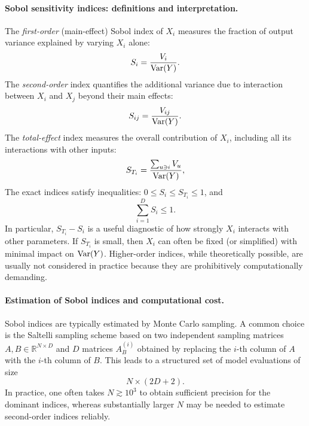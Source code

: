 \paragraph{Sobol sensitivity indices: definitions and interpretation.}
The \emph{first-order} (main-effect) Sobol index of $X_i$ measures the fraction
of output variance explained by varying $X_i$ alone:
\begin{equation}
S_i = \frac{V_i}{\mathop{\rm Var}(Y)}.
\end{equation}
The \emph{second-order} index quantifies the additional variance due to
interaction between $X_i$ and $X_j$ beyond their main effects:
\begin{equation}
S_{ij} = \frac{V_{ij}}{\mathop{\rm Var}(Y)}.
\end{equation}
The \emph{total-effect} index measures the overall contribution of $X_i$,
including all its interactions with other inputs:
\begin{equation}
S_{T_i} = \frac{\sum_{u\ni i} V_u}{\mathop{\rm Var}(Y)},
\end{equation}
The exact indices satisfy inequalities:
$0\le S_i\le S_{T_i}\le 1$, and
\begin{equation}
\sum_{i=1}^D S_i \le 1.
\end{equation}
In particular, $S_{T_i}-S_i$ is a useful diagnostic of how
strongly $X_i$ interacts with other parameters. If $S_{T_i}$ is small, then
$X_i$ can often be fixed (or simplified) with minimal impact on $\mathop{\rm Var}(Y)$.
Higher-order indices, while theoretically possible, are usually not considered
in practice because they are prohibitively computationally demanding.

\paragraph{Estimation of Sobol indices and computational cost.}
Sobol indices are typically estimated by Monte Carlo sampling. A common choice
is the Saltelli sampling scheme \cite{Saltelli_Variance_2010} based on two
independent sampling matrices $A,B\in\mathbb{R}^{N\times D}$ and $D$
 matrices $A_B^{(i)}$ obtained by replacing the
$i$-th column of $A$ with the $i$-th column of $B$. This leads to a structured
set of model evaluations of size
\begin{equation}
N \times (2D+2).
\end{equation}
In practice, one often takes $N\gtrsim 10^3$ to obtain sufficient precision for
the dominant indices, whereas substantially larger $N$ may be needed to
estimate second-order indices reliably.

